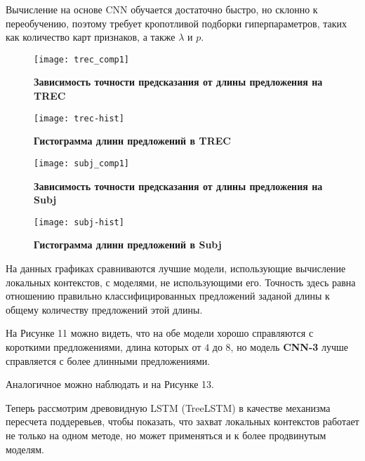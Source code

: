 Вычисление на основе CNN обучается достаточно быстро, но склонно к переобучению, поэтому требует кропотливой подборки гиперпараметров, таких как количество карт признаков, а также $\lambda$ и $p$.

\begin{figure}[H]
\texttt{[image: trec\_comp1]}
\caption{\textbf{Зависимость точности предсказания от длины предложения на TREC}}
\label{fig:context_ex}
\end{figure}

\begin{figure}[H]
\texttt{[image: trec-hist]}
\caption{\textbf{Гистограмма длинн предложений в TREC}}
\end{figure}

\begin{figure}[H]
\texttt{[image: subj\_comp1]}
\caption{\textbf{Зависимость точности предсказания от длины предложения на Subj}}
\label{fig:context_ex}
\end{figure}

\begin{figure}[H]
\texttt{[image: subj-hist]}
\caption{\textbf{Гистограмма длинн предложений в Subj}}
\end{figure}

\vspace{20mm}

На данных графиках сравниваются лучшие модели, использующие вычисление локальных контекстов, с моделями, не использующими его. Точность здесь равна отношению правильно классифицированных предложений заданой длины к общему количеству предложений этой длины. 

На Рисунке 11 можно видеть, что на обе модели хорошо справляются с короткими предложениями, длина которых от $4$ до $8$, но модель \textbf{CNN-3} лучше справляется с более длинными предложениями.

Аналогичное можно наблюдать и на Рисунке 13.

Теперь рассмотрим  древовидную LSTM (TreeLSTM) в качестве механизма пересчета поддеревьев, 
чтобы показать, что захват локальных контекстов работает не только на одном методе, 
но может применяться и к более продвинутым моделям.

